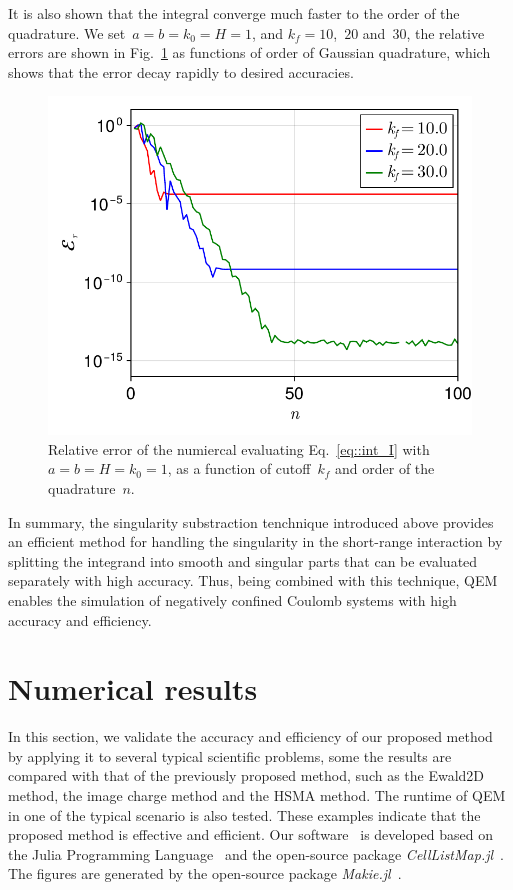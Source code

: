 It is also shown that the integral converge much faster to the order of the quadrature.
We set~$a = b = k_0 = H = 1$, and $k_f = 10$,~$20$ and~$30$, the relative errors are shown in Fig.~\ref{fig:error} as functions of order of Gaussian quadrature, which shows that the error decay rapidly to desired accuracies.

\begin{figure}[htbp]
    \centering
    \includegraphics[width = 0.5\linewidth]{figs/int_convergence.pdf}
    \caption{Relative error of the numiercal evaluating Eq.~\eqref{eq::int_I} with $a = b = H = k_0 = 1$, as a function of cutoff~$k_f$ and order of the quadrature~$n$.}
    \label{fig:error}
\end{figure}

In summary, the singularity substraction tenchnique introduced above provides an efficient method for handling the singularity in the short-range interaction by splitting the integrand into smooth and singular parts that can be evaluated separately with high accuracy.
Thus, being combined with this technique, QEM enables the simulation of negatively confined Coulomb systems with high accuracy and efficiency.

\section{Numerical results}
\label{sec:result}

In this section, we validate the accuracy and efficiency of our proposed method by applying it to several typical scientific problems, some the results are compared with that of the previously proposed method, such as the Ewald2D method, the image charge method and the HSMA method.
The runtime of QEM in one of the typical scenario is also tested.
These examples indicate that the proposed method is effective and efficient.
Our software~\cite{QuasiEwald} is developed based on the Julia Programming Language~\cite{Julia-2017} and the open-source package \emph{CellListMap.jl}~\cite{celllistmap}.
The figures are generated by the open-source package \emph{Makie.jl}~\cite{DanischKrumbiegel2021}.

